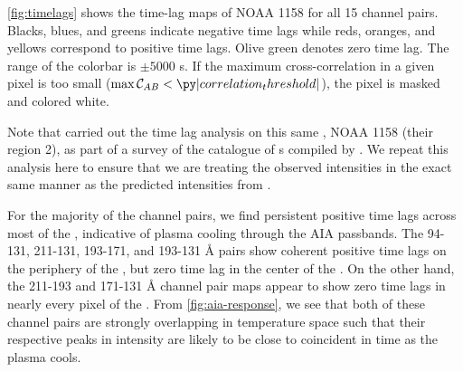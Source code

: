 \autoref{fig:timelags} shows the time-lag maps of \AR{} NOAA 1158 for all 15 channel pairs.
Blacks, blues, and greens indicate negative time lags while reds, oranges, and yellows correspond to positive time lags.
Olive green denotes zero time lag.
The range of the colorbar is $\pm5000$ s.
If the maximum cross-correlation in a given pixel is too small ($\max\mathcal{C}_{AB}<\py|correlation_threshold|$), the pixel is masked and colored white.

Note that  carried out the time lag analysis on this same \AR{}, NOAA 1158 (their region 2), as part of a survey of the catalogue of \AR{}s compiled by \citet{warren_systematic_2012}.
We repeat this analysis here to ensure that we are treating the observed intensities in the exact same manner as the predicted intensities from .

For the majority of the channel pairs, we find persistent positive time lags across most of the \AR{}, indicative of plasma cooling through the AIA passbands.
The 94-131, 211-131, 193-171, and 193-131 \AA{} pairs show coherent positive time lags on the periphery of the \AR{}, but zero time lag in the center of the \AR{}.
On the other hand, the 211-193 and 171-131 \AA{} channel pair maps appear to show zero time lags in nearly every pixel of the \AR{}.
From \autoref{fig:aia-response}, we see that both of these channel pairs are strongly overlapping in temperature space such that their respective peaks in intensity are likely to be close to coincident in time as the plasma cools. 

